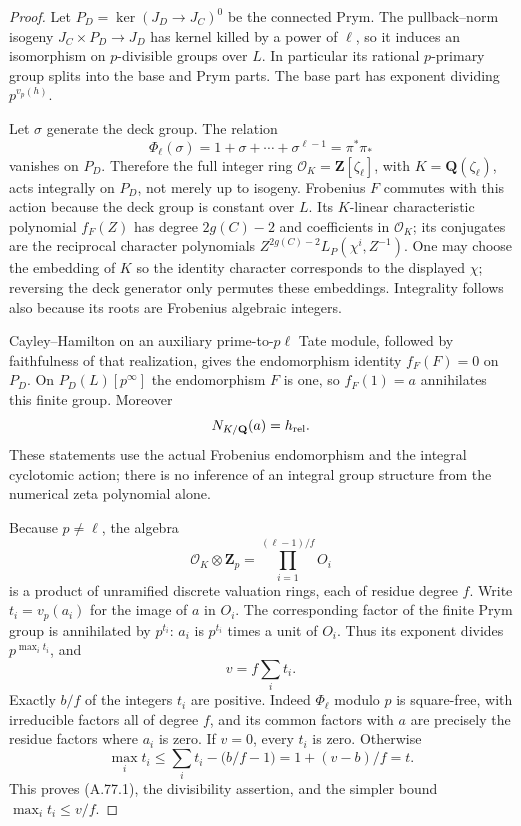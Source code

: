 \documentclass[11pt]{article}
\begin{document}
\begin{proof}
Let $P_D=\ker(J_D\to J_C)^0$ be the connected Prym.
The pullback--norm isogeny
$J_C\times P_D\to J_D$ has kernel killed by a power
of $\ell$, so it induces an isomorphism on $p$-divisible
groups over $L$. In particular its rational $p$-primary
group splits into the base and Prym parts. The base part
has exponent dividing $p^{v_p(h)}$.

Let $\sigma$ generate the deck group. The relation
\[
 \Phi_\ell(\sigma)=1+\sigma+\cdots+\sigma^{\ell-1}
                       =\pi^*\pi_*
\]
vanishes on $P_D$. Therefore the full integer ring
$\mathcal O_K=\mathbf Z[\zeta_\ell]$, with
$K=\mathbf Q(\zeta_\ell)$, acts integrally on $P_D$,
not merely up to isogeny. Frobenius $F$ commutes with
this action because the deck group is constant over $L$.
Its $K$-linear characteristic polynomial $f_F(Z)$
has degree $2g(C)-2$ and coefficients in $\mathcal O_K$;
its conjugates are the reciprocal character polynomials
$Z^{2g(C)-2}L_P(\chi^i,Z^{-1})$. One may choose the
embedding of $K$ so the identity character corresponds
to the displayed $\chi$; reversing the deck generator
only permutes these embeddings. Integrality follows
also because its roots are Frobenius algebraic integers.

Cayley--Hamilton on an auxiliary prime-to-$p\ell$
Tate module, followed by faithfulness of that realization,
gives the endomorphism identity $f_F(F)=0$ on $P_D$.
On $P_D(L)[p^\infty]$ the endomorphism $F$ is one,
so $f_F(1)=a$ annihilates this finite group. Moreover
\[
                      N_{K/\mathbf Q}(a)=h_{\rm rel}.
\]
These statements use the actual Frobenius endomorphism
and the integral cyclotomic action; there is no inference
of an integral group structure from the numerical zeta
polynomial alone.

Because $p\ne\ell$, the algebra
\[
 \mathcal O_K\otimes\mathbf Z_p=\prod_{i=1}^{(\ell-1)/f}O_i
\]
is a product of unramified discrete valuation rings,
each of residue degree $f$. Write $t_i=v_p(a_i)$ for
the image of $a$ in $O_i$. The corresponding factor
of the finite Prym group is annihilated by $p^{t_i}$:
$a_i$ is $p^{t_i}$ times a unit of $O_i$.
Thus its exponent divides $p^{\max_i t_i}$, and
\[
                       v=f\sum_i t_i.
\]
Exactly $b/f$ of the integers $t_i$ are positive.
Indeed $\Phi_\ell$ modulo $p$ is square-free, with
irreducible factors all of degree $f$, and its common
factors with $a$ are precisely the residue factors
where $a_i$ is zero. If $v=0$, every $t_i$ is zero.
Otherwise
\[
 \max_i t_i\le\sum_i t_i-\bigl(b/f-1\bigr)
                         =1+(v-b)/f=t.
\]
This proves (A.77.1), the divisibility assertion,
and the simpler bound $\max_i t_i\le v/f$.


\end{proof}
\end{document}
